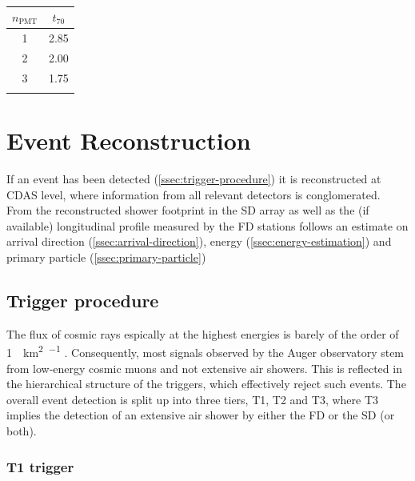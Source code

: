 \begin{table}[h]
	\begin{center}
	\caption{}
	\begin{tabular*}{0.2\textwidth}{@{\extracolsep{\fill}} cc}
		\toprule
		$n_\text{PMT}$ & $t_{70}$ \\
		\midrule
		1 & 2.85 \\
		2 & 2.00 \\
		3 & 1.75 \\
		\bottomrule
	\label{tab:calib-trigger-thresholds}
	\end{tabular*}
	\end{center}
\end{table}

\section{Event Reconstruction}
\label{sec:event-reconstruction}

If an event has been detected (\autoref{ssec:trigger-procedure}) it is reconstructed at CDAS level, where information from all relevant detectors is conglomerated.
From the reconstructed shower footprint in the SD array as well as the (if available) longitudinal profile measured by the FD stations follows an estimate on 
arrival direction (\autoref{ssec:arrival-direction}), energy (\autoref{ssec:energy-estimation}) and primary particle (\autoref{ssec:primary-particle})

\subsection{Trigger procedure}
\label{ssec:trigger-procedure}

The flux of cosmic rays espically at the highest energies is barely of the order of \SI[per-mode=reciprocal]{1}{\per\kilo\meter\squared\per\year} 
\cite{hillas1984origin}. Consequently, most signals observed by the Auger observatory stem from low-energy cosmic muons and not extensive air showers. This is 
reflected in the hierarchical structure of the triggers, which effectively reject such events. The overall event detection is split up into three tiers, T1, T2 and
T3, where T3 implies the detection of an extensive air shower by either the FD or the SD (or both).

\subsubsection{T1 trigger}
\label{sssec:t1-trigger}

